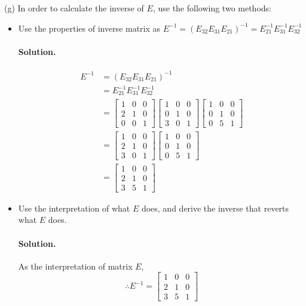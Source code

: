 \newpage
(g) In order to calculate the inverse of $E$, use the following two methods:\\
\begin{itemize}
    \item Use the properties of inverse matrix as $E^{-1}=(E_{32}E_{31}E_{21})^{-1}=E_{21}^{-1}E_{31}^{-1}E_{32}^{-1}$\\
    \paragraph*{Solution.}
    \begin{align*}
        E^{-1} &= (E_{32}E_{31}E_{21})^{-1}\\
        &= E_{21}^{-1}E_{31}^{-1}E_{32}^{-1}\\
        &= \begin{bmatrix}
            1&0&0\\2&1&0\\0&0&1
        \end{bmatrix} \begin{bmatrix}
            1&0&0\\0&1&0\\3&0&1
        \end{bmatrix}\begin{bmatrix}
            1&0&0\\0&1&0\\0&5&1
        \end{bmatrix}\\
        &= \begin{bmatrix}
            1&0&0\\2&1&0\\3&0&1
        \end{bmatrix} \begin{bmatrix}
            1&0&0\\0&1&0\\0&5&1
        \end{bmatrix}\\
        &= \begin{bmatrix}
            1&0&0\\
            2&1&0\\
            3&5&1
        \end{bmatrix}
    \end{align*}
    \item Use the interpretation of what $E$ does, and derive the inverse that reverts what $E$ does.\\
    \paragraph*{Solution.}
    As the interpretation of matrix $E$,
    $$\therefore E^{-1} = \begin{bmatrix}
            1&0&0\\
            2&1&0\\
            3&5&1
        \end{bmatrix}$$
\end{itemize}

